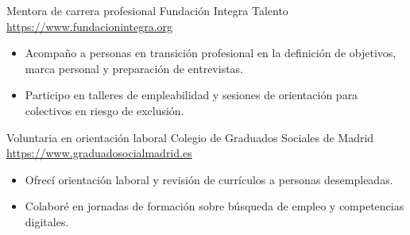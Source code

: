 \documentclass[a4paper, serif, 10pt]{moderncv}
\begin{document}
        {Mentora de carrera profesional}
        {Fundación Integra Talento}
        {\url{https://www.fundacionintegra.org}}
        {}
        {\begin{itemize}
\item Acompaño a personas en transición profesional en la definición de objetivos, marca personal y preparación de entrevistas.
\item Participo en talleres de empleabilidad y sesiones de orientación para colectivos en riesgo de exclusión.
\end{itemize}}
    

        {Voluntaria en orientación laboral}
        {Colegio de Graduados Sociales de Madrid}
        {\url{https://www.graduadosocialmadrid.es}}
        {}
        {\begin{itemize}
\item Ofrecí orientación laboral y revisión de currículos a personas desempleadas.
\item Colaboré en jornadas de formación sobre búsqueda de empleo y competencias digitales.
\end{itemize}}
    
\end{document}
